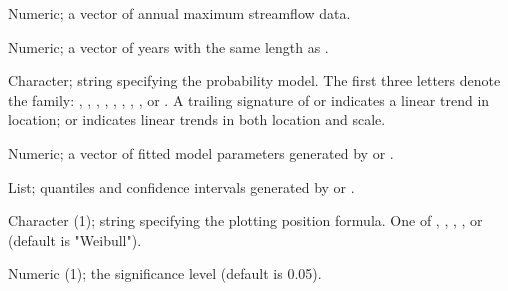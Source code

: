 \documentclass[a4paper]{book}
\begin{document}
\begin{Arguments}
\begin{ldescription}
\item[\code{data}] Numeric; a vector of annual maximum streamflow data.

\item[\code{years}] Numeric; a vector of years with the same length as .

\item[\code{model}] Character; string specifying the probability model. The first three
letters denote the family: , , , , , , ,
, or . A trailing signature of  or  indicates a linear trend
in location;  or  indicates linear trends in both location and scale.

\item[\code{params}] Numeric; a vector of fitted model parameters generated by
 or .

\item[\code{uncertainty}] List; quantiles and confidence intervals
generated by  or .

\item[\code{pp.formula}] Character (1); string specifying the plotting position formula.
One of , , , , or 
(default is "Weibull").

\item[\code{alpha}] Numeric (1); the significance level (default is 0.05).
\end{ldescription}
\end{Arguments}
%
\end{document}

